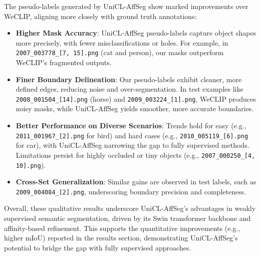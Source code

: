 The pseudo-labels generated by UniCL-AffSeg show marked improvements over WeCLIP, aligning more closely with ground truth annotations:
\begin{itemize}
    \item \textbf{Higher Mask Accuracy}: UniCL-AffSeg pseudo-labels capture object shapes more precisely, with fewer misclassifications or holes. For example, in \texttt{2007\_003778\_[7, 15].png} (cat and person), our masks outperform WeCLIP's fragmented outputs.
    \item \textbf{Finer Boundary Delineation}: Our pseudo-labels exhibit cleaner, more defined edges, reducing noise and over-segmentation. In test examples like \texttt{2008\_001504\_[14].png} (horse) and \texttt{2009\_003224\_[1].png}, WeCLIP produces noisy masks, while UniCL-AffSeg yields smoother, more accurate boundaries.
    \item \textbf{Better Performance on Diverse Scenarios}: Trends hold for easy (e.g., \texttt{2011\_001967\_[2].png} for bird) and hard cases (e.g., \texttt{2010\_005119\_[6].png} for car), with UniCL-AffSeg narrowing the gap to fully supervised methods. Limitations persist for highly occluded or tiny objects (e.g., \texttt{2007\_000250\_[4, 10].png}).
    \item \textbf{Cross-Set Generalization}: Similar gains are observed in test labels, such as \texttt{2009\_004084\_[2].png}, underscoring boundary precision and completeness.
\end{itemize}

Overall, these qualitative results underscore UniCL-AffSeg's advantages in weakly supervised semantic segmentation, driven by its Swin transformer backbone and affinity-based refinement. This supports the quantitative improvements (e.g., higher mIoU) reported in the results section, demonstrating UniCL-AffSeg's potential to bridge the gap with fully supervised approaches.



